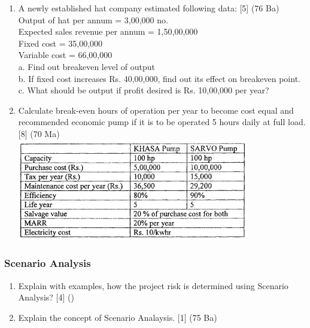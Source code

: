 \documentclass[12pt]{article}
\begin{document}
\begin{enumerate}
			\item A newly established hat company estimated following data: \hfill [5] (76 Ba)\\
			Output of hat per annum = 3,00,000 no.\\
			Expected sales revenue per annum = 1,50,00,000\\
			Fixed cost = 35,00,000\\
			Variable cost = 66,00,000\\[0pt]
			a. Find out breakeven level of output\\
			b. If fixed cost increases Rs. 40,00,000, find out its effect on breakeven point.\\
			c. What should be output if profit desired is Rs. 10,00,000 per year?

			\item Calculate break-even hours of operation per year to become cost equal and recommended economic pump if it is to be operated 5 hours daily at full load. \hfill [8] (70 Ma)\\
			\includegraphics[width=4in]{./pics/ee_5}
		\end{enumerate}

	\subsubsection{Scenario Analysis}
		\begin{enumerate}[noitemsep, topsep=0pt]
			\item Explain with examples, how the project risk is determined using Scenario Analysis? \hfill [4] ()

			\item Explain the concept of Scenario Analaysis. \hfill [1] (75 Ba)
		\end{enumerate}
\end{document}
